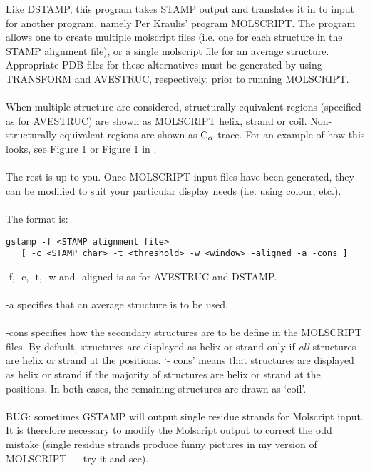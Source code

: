 Like DSTAMP, this program takes STAMP output and translates it in to input
for another program, namely Per Kraulis' program MOLSCRIPT.  The program
allows one to create multiple molscript files (i.e. one for each structure
in the STAMP alignment file), or a single molscript file for an average
structure.  Appropriate PDB files for these alternatives must be
generated by using TRANSFORM and AVESTRUC, respectively, prior to running
MOLSCRIPT.\\
\\
When multiple structure are considered, structurally equivalent regions
(specified as for AVESTRUC) are shown as MOLSCRIPT helix, strand or coil.
Non-structurally equivalent regions are shown as ${\rm C}_{\alpha}$ trace.  For an
example of how this looks, see Figure 1 \cite{rb94} or Figure 1 in 
\cite{russell94}.\\
\\
The rest is up to you.  Once MOLSCRIPT input files have been generated, they
can be modified to suit your particular display needs (i.e. using colour, 
etc.).\\
\\
The format is:\\

\begin{scriptsize}\begin{verbatim}
gstamp -f <STAMP alignment file> 
   [ -c <STAMP char> -t <threshold> -w <window> -aligned -a -cons ]
\end{verbatim} \end{scriptsize}

-f, -c, -t, -w and -aligned is as for AVESTRUC and DSTAMP.\\
\\
-a specifies that an average structure is to be used.\\
\\
-cons specifies how the secondary structures are to be define in the 
  MOLSCRIPT files.  By default, structures are displayed as helix or strand
  only if {\em all} structures are helix or strand at the positions.  `- cons'
  means that structures are displayed as helix or strand if the majority  
  of structures are helix or strand at the positions.  In both cases, the
  remaining structures are drawn as `coil'.\\
\\
BUG: sometimes GSTAMP will output single residue strands for Molscript 
input.  It is therefore necessary to modify the Molscript output to 
correct the odd mistake (single residue strands produce funny pictures
in my version of MOLSCRIPT --- try it and see).


